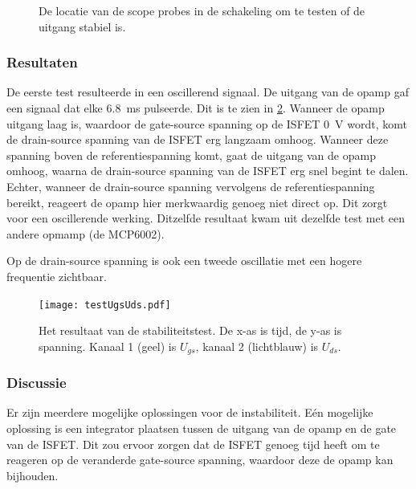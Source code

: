 \begin{figure}[!htbp]
    \centering
    \def\svgwidth{0.75\textwidth}
    
    \caption{De locatie van de scope probes in de schakeling om te testen of de uitgang stabiel is.}
    \label{fig:test ISFET circuit best}
\end{figure}


\subsubsection{Resultaten} \label{sec:stabilityTestResults}

De eerste test resulteerde in een oscillerend signaal. De uitgang van de opamp gaf een signaal dat elke \qty{6.8}{\milli\second} pulseerde. Dit is te zien in \cref{fig:resultUgsUds}.
Wanneer de opamp uitgang laag is, waardoor de gate-source spanning op de ISFET \qty{0}{\volt} wordt, komt de drain-source spanning van de ISFET erg langzaam omhoog. Wanneer deze spanning boven de referentiespanning komt, gaat de uitgang van de opamp omhoog, waarna de drain-source spanning van de ISFET erg snel begint te dalen. Echter, wanneer de drain-source spanning vervolgens de referentiespanning bereikt, reageert de opamp hier merkwaardig genoeg niet direct op. Dit zorgt voor een oscillerende werking. Ditzelfde resultaat kwam uit dezelfde test met een andere opmamp (de MCP6002).

Op de drain-source spanning is ook een tweede oscillatie met een hogere frequentie zichtbaar.



%


\begin{figure}[!htbp]
    \centering
    \def\svgwidth{0.75\textwidth}
    \texttt{[image: testUgsUds.pdf]}
    \caption{Het resultaat van de stabiliteitstest. De x-as is tijd, de y-as is spanning. Kanaal 1 (geel) is $U_{gs}$, kanaal 2 (lichtblauw) is $U_{ds}$.}
    \label{fig:resultUgsUds}
\end{figure}


\subsubsection{Discussie}
Er zijn meerdere mogelijke oplossingen voor de instabiliteit.
Eén mogelijke oplossing is een integrator plaatsen tussen de uitgang van de opamp en de gate van de ISFET. Dit zou ervoor zorgen dat de ISFET genoeg tijd heeft om te reageren op de veranderde gate-source spanning, waardoor deze de opamp kan bijhouden.

